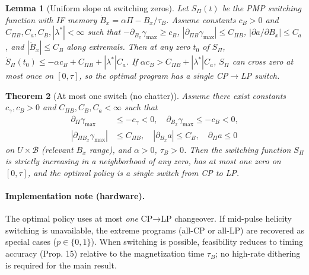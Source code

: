 \documentclass[aps,pre,twocolumn,showpacs,superscriptaddress]{revtex4-2}
\newtheorem{theorem}{Theorem}
\newtheorem{lemma}[theorem]{Lemma}
\theoremstyle{definition}
\begin{document}
\begin{lemma}[Uniform slope at switching zeros]\label{lem:slope-dominance}
Let $S_\Pi(t)$ be the PMP switching function with IF memory $\dot B_x=\alpha\Pi-B_x/\tau_B$.
Assume constants $c_B>0$ and $C_{\Pi B},C_a,C_B,|\lambda^{\ast}|<\infty$ such that
$-\partial_{B_x}\gamma_{\max}\ge c_B$, $|\partial_{\Pi B}\gamma_{\max}|\le C_{\Pi B}$,
$|\partial a/\partial B_x|\le C_a$, and $|\dot B_x|\le C_B$ along extremals.
Then at any zero $t_0$ of $S_\Pi$, $\dot S_\Pi(t_0)\le -\alpha c_B + C_{\Pi B}+|\lambda^{\ast}|C_a$.
If $\alpha c_B > C_{\Pi B}+|\lambda^{\ast}|C_a$, $S_\Pi$ can cross zero at most once on $[0,\tau]$,
so the optimal program has a single CP$\to$LP switch.
\end{lemma}

\begin{theorem}[At most one switch (no chatter)]\label{thm:oneswitch-PMP}
Assume there exist constants $c_\gamma,c_B>0$ and $C_{\Pi B},C_{B},C_a<\infty$ such that
\begin{align}
\partial_\Pi \gamma_{\max} &\le -c_\gamma<0,\quad \partial_{B_x}\gamma_{\max}\le -c_B<0,\nonumber\\
|\partial_{\Pi B_x}\gamma_{\max}| &\le C_{\Pi B},\quad |\partial_{B_x} a|\le C_{B},\quad \partial_\Pi a\le 0\nonumber
\end{align}
on $U\times\mathcal{B}$ (relevant $B_x$ range), and $\alpha>0$, $\tau_B>0$. Then the switching function $S_\Pi$ is strictly increasing in a neighborhood of any zero, has at most one zero on $[0,\tau]$, and the optimal policy is a single switch from CP to LP.
\end{theorem}

\paragraph*{Implementation note (hardware).}
The optimal policy uses at most \emph{one} CP→LP changeover. If mid-pulse helicity switching is unavailable, the extreme programs (all-CP or all-LP) are recovered as special cases ($p\in\{0,1\}$). When switching is possible, feasibility reduces to timing accuracy (Prop. 15) relative to the magnetization time $\tau_B$; no high-rate dithering is required for the main result.
\end{document}

